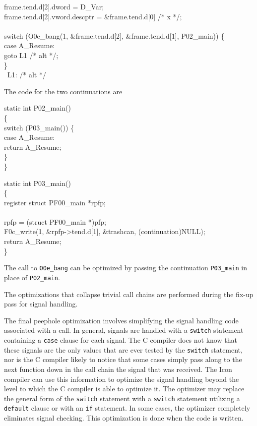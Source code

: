 \goodbreak
\begin{iconcode}
frame.tend.d[2].dword = D\_Var;\\
frame.tend.d[2].vword.descptr = \&frame.tend.d[0] /* x */;\\
\\
switch (O0e\_bang(1, \&frame.tend.d[2], \&frame.tend.d[1], P02\_main)) \{\\
\>case A\_Resume:\\
\>\>goto L1 /* alt */;\\
\>\}\\
\ L1: /* alt */\\
\end{iconcode}

\noindent
The code for the two continuations are 

\goodbreak
\begin{iconcode}
static int P02\_main()\\
\{\\
\>switch (P03\_main()) \{\\
\>\>case A\_Resume:\\
\>\>\>return A\_Resume;\\
\>\>\}\\
\}\\
\end{iconcode}

\begin{iconcode}
static int P03\_main()\\
\{\\
\>register struct PF00\_main *rpfp;\\
\\
\>rpfp = (struct PF00\_main *)pfp;\\
\>F0c\_write(1, \&rpfp->tend.d[1], \&trashcan, (continuation)NULL);\\
\>return A\_Resume;\\
\}\\
\end{iconcode}

\noindent
The call to \texttt{O0e\_bang} can be optimized by passing the
continuation \texttt{P03\_main} in place of \texttt{P02\_main}.

The optimizations that collapse trivial call chains are performed
during the fix-up pass for signal handling.

The final peephole optimization involves simplifying the signal
handling code associated with a call. In general, signals are handled
with a \texttt{switch} statement containing a \texttt{case} clause for
each signal. The C compiler does not know that these signals are the
only values that are ever tested by the \texttt{switch} statement, nor
is the C compiler likely to notice that some cases simply pass along
to the next function down in the call chain the signal that was
received. The Icon compiler can use this information to optimize the
signal handling beyond the level to which the C compiler is able to
optimize it. The optimizer may replace the general form of the
\texttt{switch} statement with a \texttt{switch} statement utilizing a
\texttt{default} clause or with an \texttt{if} statement. In some
cases, the optimizer completely eliminates signal checking. This
optimization is done when the code is written.

